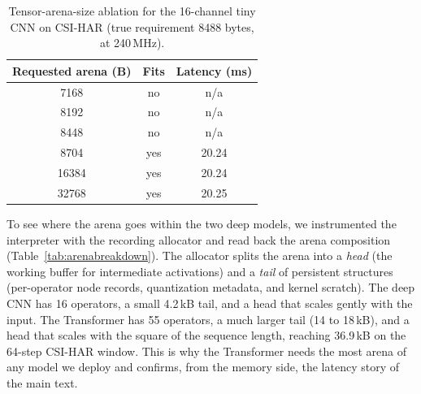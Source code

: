 \documentclass[10pt,journal,twocolumn]{IEEEtran}
\begin{document}
\begin{table}[t]
\caption{Tensor-arena-size ablation for the 16-channel tiny CNN on CSI-HAR (true requirement 8488 bytes, at 240\,MHz).}
\label{tab:arena}
\centering
\footnotesize
\setlength{\tabcolsep}{6pt}
\begin{tabular}{ccc}
\toprule
Requested arena (B) & Fits & Latency (ms) \\
\midrule
7168  & no  & n/a \\
8192  & no  & n/a \\
8448  & no  & n/a \\
8704  & yes & 20.24 \\
16384 & yes & 20.24 \\
32768 & yes & 20.25 \\
\bottomrule
\end{tabular}
\end{table}

To see where the arena goes within the two deep models, we instrumented the interpreter with the recording allocator and read back the arena composition (Table~\ref{tab:arenabreakdown}). The allocator splits the arena into a \emph{head} (the working buffer for intermediate activations) and a \emph{tail} of persistent structures (per-operator node records, quantization metadata, and kernel scratch). The deep CNN has 16 operators, a small 4.2\,kB tail, and a head that scales gently with the input. The Transformer has 55 operators, a much larger tail (14 to 18\,kB), and a head that scales with the square of the sequence length, reaching 36.9\,kB on the 64-step CSI-HAR window. This is why the Transformer needs the most arena of any model we deploy and confirms, from the memory side, the latency story of the main text.

\begin{table}[t]
\caption{Tensor-arena composition of the two deployable deep models, from the recording allocator (kB). \emph{Head} is the activation working buffer; \emph{tail} is the persistent structures; \emph{Ops} is the operator count.}
\label{tab:arenabreakdown}
\centering
\footnotesize
\setlength{\tabcolsep}{5pt}
\end{table}
\end{document}
